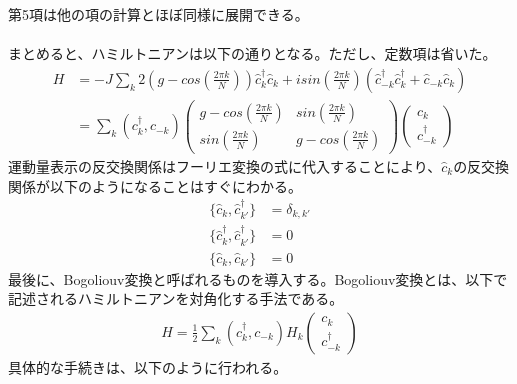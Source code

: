\documentclass[a4paper,10.5pt]{article}
\numberwithin{equation}{section}
\begin{document}
第5項は他の項の計算とほぼ同様に展開できる。\\
\\
まとめると、ハミルトニアンは以下の通りとなる。ただし、定数項は省いた。
\begin{equation}\begin{split}
    H&=-J\sum_{k} 2(g-cos(\frac{2\pi k}{N}))\hat{c}^{\dagger}_{k}\hat{c}_{k} 
       + isin(\frac{2\pi k}{N})(\hat{c}^{\dagger}_{-k}\hat{c}^{\dagger}_{k} + \hat{c}_{-k}\hat{c}_{k})\\
       &=\sum_{k}(c_{k}^{\dagger},c_{-k})\begin{pmatrix}
           g-cos(\frac{2\pi k}{N}) & sin(\frac{2\pi k}{N})\\
           sin(\frac{2\pi k}{N}) & g-cos(\frac{2\pi k}{N})
       \end{pmatrix}
       \begin{pmatrix}
           c_{k} \\ c_{-k}^{\dagger}
       \end{pmatrix}
\end{split} \end{equation}
 運動量表示の反交換関係はフーリエ変換の式に代入することにより、$\hat{c}_{k}$の反交換関係が以下のようになることはすぐにわかる。
 \begin{equation}\begin{split}
     \{ \hat{c}_{k},\hat{c}_{k'}^{\dagger} \} &=\delta_{k,k'}\\ 
     \{ \hat{c}_{k}^{\dagger},\hat{c}_{k'}^{\dagger} \} &=0\\ 
     \{ \hat{c}_{k},\hat{c}_{k'} \} &=0
 \end{split} \end{equation}
最後に、Bogoliouv変換と呼ばれるものを導入する。Bogoliouv変換とは、以下で記述されるハミルトニアンを対角化する手法である。
\begin{align*}
    H=\frac{1}{2}\sum_{k}(c_{k}^{\dagger},c_{-k})H_{k}
       \begin{pmatrix}
           c_{k} \\ c_{-k}^{\dagger}
       \end{pmatrix}
\end{align*}
具体的な手続きは、以下のように行われる。
\end{document}
